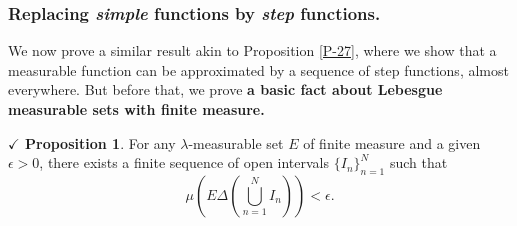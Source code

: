 \documentclass{article}
\theoremstyle{definition}
\theoremstyle{remark}
\theoremstyle{definition}
\theoremstyle{definition}
\newtheorem{proposition}{$\checkmark$ Proposition}
\theoremstyle{definition}
\newcommand{\bunion}{\bigcup}
\newcommand{\m}[1]{\mu\left (#1\right )}
\begin{document}
\subsubsection{Replacing \emph{simple} functions by \emph{step} functions.}
We now prove a similar result akin to Proposition \ref{P-27}, where we show that a measurable function can be approximated by a sequence of step functions, almost everywhere. But before that, we prove \textbf{a basic fact about Lebesgue measurable sets with finite measure.}
\begin{proposition}
	For any $ \lambda $-measurable set $ E $ of finite measure and a given $ \epsilon > 0 $, there exists a finite sequence of open intervals $ \{I_n\}_{n=1}^{N} $ such that 
	\[\m{E\Delta \left (\bunion_{n=1}^{N}I_n\right )} < \epsilon.\]
\end{proposition}
\end{document}
